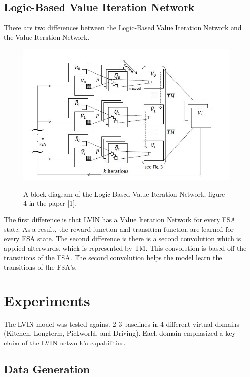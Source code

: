 \documentclass[letterpaper, 10 pt, conference]{ieeeconf}  %
\begin{document}
\subsection{Logic-Based Value Iteration Network}
There are two differences between the Logic-Based Value Iteration Network and the Value Iteration Network. 
\begin{figure}[h]
 \centering
 \includegraphics[scale=.5]{LVIN.JPG}\\
 \caption{A block diagram of the Logic-Based Value Iteration Network, figure 4 in the paper [1].}
\end{figure}

The first difference is that LVIN has a Value Iteration Network for every FSA state. As a result, the reward function and transition function are learned for every FSA state.
\newline 
\indent The second difference is there is a second convolution which is applied afterwards, which is represented by TM. This convolution is based off the transitions of the FSA. The second convolution helps the model learn the transitions of the FSA's.

\section{Experiments}
The LVIN model was tested against 2-3 baselines in 4 different virtual domains (Kitchen, Longterm, Pickworld, and Driving). Each domain emphasized a key claim of the LVIN network's capabilities. 

\subsection{Data Generation}
\end{document}
